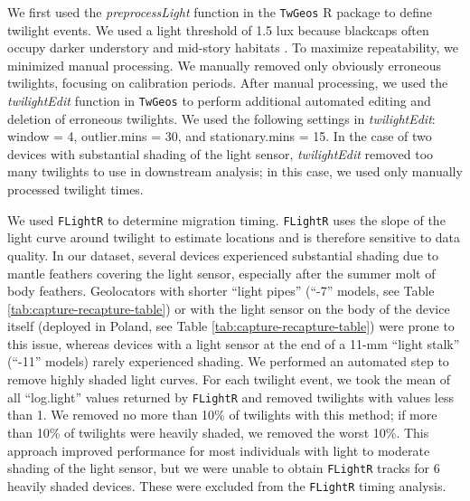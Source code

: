 \documentclass[a4paper, nobind]{templates/ociamthesis}
\begin{document}
We first used the \emph{preprocessLight} function in the \texttt{TwGeos} \autocite{wotherspoonTwGeosBasicData2016} R package to define twilight events. We used a light threshold of 1.5 lux because blackcaps often occupy darker understory and mid-story habitats \autocite{rakhimberdievComparingInferencesSolar2016}. To maximize repeatability, we minimized manual processing. We manually removed only obviously erroneous twilights, focusing on calibration periods. After manual processing, we used the \emph{twilightEdit} function in \texttt{TwGeos} to perform additional automated editing and deletion of erroneous twilights. We used the following settings in \emph{twilightEdit}: window = 4, outlier.mins = 30, and stationary.mins = 15. In the case of two devices with substantial shading of the light sensor, \emph{twilightEdit} removed too many twilights to use in downstream analysis; in this case, we used only manually processed twilight times.

We used \texttt{FLightR} \autocite{rakhimberdievFLightRPackageReconstructing2017,rakhimberdievHiddenMarkovModel2015} to determine migration timing. \texttt{FLightR} uses the slope of the light curve around twilight to estimate locations and is therefore sensitive to data quality. In our dataset, several devices experienced substantial shading due to mantle feathers covering the light sensor, especially after the summer molt of body feathers. Geolocators with shorter ``light pipes'' (``-7'' models, see Table \ref{tab:capture-recapture-table}) or with the light sensor on the body of the device itself (deployed in Poland, see Table \ref{tab:capture-recapture-table}) were prone to this issue, whereas devices with a light sensor at the end of a 11-mm ``light stalk'' (``-11'' models) rarely experienced shading. We performed an automated step to remove highly shaded light curves. For each twilight event, we took the mean of all ``log.light'' values returned by \texttt{FLightR} and removed twilights with values less than 1. We removed no more than 10\% of twilights with this method; if more than 10\% of twilights were heavily shaded, we removed the worst 10\%. This approach improved performance for most individuals with light to moderate shading of the light sensor, but we were unable to obtain \texttt{FLightR} tracks for 6 heavily shaded devices. These were excluded from the \texttt{FLightR} timing analysis.
\end{document}
